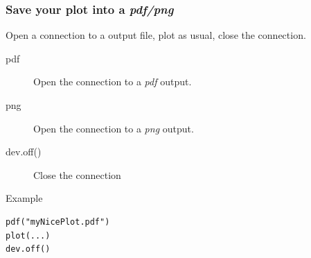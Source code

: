 \documentclass[10pt]{beamer}
\newenvironment{xframe}[2][]
  {\begin{frame}[fragile,environment=xframe,#1]
  \frametitle{#2}}
  {\end{frame}}
\begin{document}

\begin{xframe}{Save your plot into a {\it pdf/png}}
  \begin{block}{}
    Open a connection to a output file, plot as usual, close the connection.
    \begin{description}
    \item[pdf] Open the connection to a {\it pdf} output.
    \item[png] Open the connection to a {\it png} output.
    \item[dev.off()] Close the connection
    \end{description}
  \end{block}
  \begin{exampleblock}{Example}
\begin{verbatim}
pdf("myNicePlot.pdf")
plot(...)
dev.off()
\end{verbatim}  
  \end{exampleblock}
\end{xframe}
\end{document}
